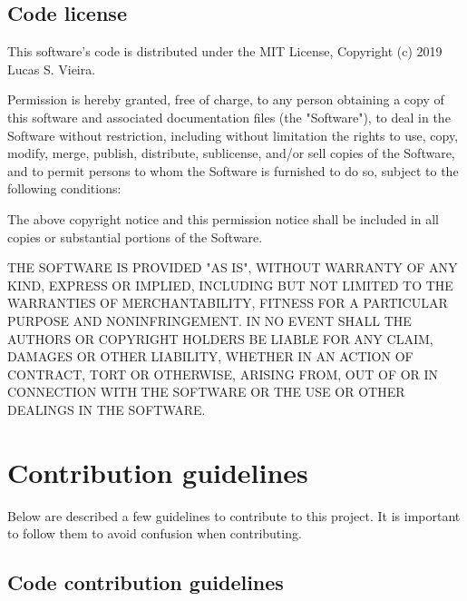 \documentclass[openright,a4paper,twoside,12pt]{memoir}
\begin{document}
\subsection{Code license}
\label{sec:org142bb77}

This software's code is distributed under the MIT License, Copyright
(c) 2019 Lucas S. Vieira.

Permission is hereby granted, free of charge, to any person obtaining
a copy of this software and associated documentation files (the
"Software"), to deal in the Software without restriction, including
without limitation the rights to use, copy, modify, merge, publish,
distribute, sublicense, and/or sell copies of the Software, and to
permit persons to whom the Software is furnished to do so, subject
to the following conditions:

The above copyright notice and this permission notice shall be
included in all copies or substantial portions of the Software.

THE SOFTWARE IS PROVIDED "AS IS", WITHOUT WARRANTY OF ANY KIND,
EXPRESS OR IMPLIED, INCLUDING BUT NOT LIMITED TO THE WARRANTIES OF
MERCHANTABILITY, FITNESS FOR A PARTICULAR PURPOSE AND
NONINFRINGEMENT. IN NO EVENT SHALL THE AUTHORS OR COPYRIGHT HOLDERS
BE LIABLE FOR ANY CLAIM, DAMAGES OR OTHER LIABILITY, WHETHER IN AN
ACTION OF CONTRACT, TORT OR OTHERWISE, ARISING FROM, OUT OF OR IN
CONNECTION WITH THE SOFTWARE OR THE USE OR OTHER DEALINGS IN THE
SOFTWARE.

\section{Contribution guidelines}
\label{sec:org8af4256}

Below are described a few guidelines to contribute to this project. It
is important to follow them to avoid confusion when contributing.

\subsection{Code contribution guidelines}
\label{sec:orgc9b3637}
\end{document}
